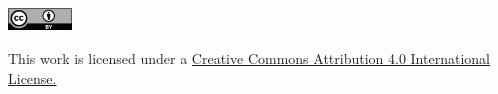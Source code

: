 \documentclass[handout]{beamer}   %
\begin{document}
\begin{frame}[fragile]
\begin{columns}[t]
\begin{column}{0.61\textwidth}
\begin{itemize}
      \end{itemize}
    \end{column}
  \end{columns}

  \vspace{0.18cm}

  \begin{center}
    \includegraphics[width=1.7cm]{img/ccby40.png}

    \vspace{0.1cm}

    \scriptsize This work is licensed under a
    \href{https://creativecommons.org/licenses/by/4.0/}{Creative
      Commons Attribution 4.0 International License.}
  \end{center}

\end{frame}

\end{document}
